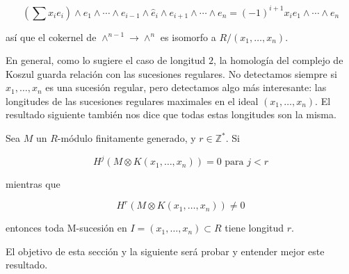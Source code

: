 $$ \left(\sum x_ie_i\right)\wedge e_1\wedge\cdots\wedge e_{i-1}\wedge \hat{e}_i\wedge e_{i+1}\wedge\cdots\wedge e_n = (-1)^{i+1}x_ie_1\wedge\cdots\wedge e_n$$

así que el cokernel de $\wedge^{n-1} \rightarrow \wedge^n$ es isomorfo a $R/(x_1,\dots,x_n)$.

En general, como lo sugiere el caso de longitud $2$, la homología del complejo de Koszul guarda relación con las sucesiones regulares. No detectamos siempre si $x_1, \dots, x_n$ es una sucesión regular, pero detectamos algo más interesante: las longitudes de las sucesiones regulares maximales en el ideal $(x_1, \dots, x_n)$. El resultado siguiente también nos dice que todas estas longitudes son la misma.

\begin{theorem}
Sea $M$ un $R$-módulo finitamente generado, y $r \in \mathbb{Z}^*$. Si

$$ H^j(M\otimes K(x_1,\dots,x_n)) = 0 \textrm{ para } j < r $$

mientras que

$$ H^r(M\otimes K(x_1,\dots,x_n)) \neq 0 $$

entonces toda M-sucesión en $I = (x_1,\dots, x_n) \subset R$ tiene longitud $r$.
\end{theorem}

El objetivo de esta sección y la siguiente será probar y entender mejor este resultado.

